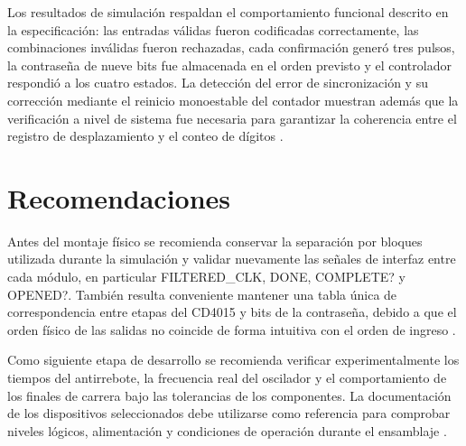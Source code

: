 \documentclass[10pt,journal]{IEEEtran}
\begin{document}
Los resultados de simulación respaldan el comportamiento funcional descrito en la especificación: las entradas válidas fueron codificadas correctamente, las combinaciones inválidas fueron rechazadas, cada confirmación generó tres pulsos, la contraseña de nueve bits fue almacenada en el orden previsto y el controlador respondió a los cuatro estados. La detección del error de sincronización y su corrección mediante el reinicio monoestable del contador muestran además que la verificación a nivel de sistema fue necesaria para garantizar la coherencia entre el registro de desplazamiento y el conteo de dígitos \cite{bitacora}.

\section{Recomendaciones}
Antes del montaje físico se recomienda conservar la separación por bloques utilizada durante la simulación y validar nuevamente las señales de interfaz entre cada módulo, en particular FILTERED\_CLK, DONE, COMPLETE? y OPENED?. También resulta conveniente mantener una tabla única de correspondencia entre etapas del CD4015 y bits de la contraseña, debido a que el orden físico de las salidas no coincide de forma intuitiva con el orden de ingreso \cite{bitacora}.

Como siguiente etapa de desarrollo se recomienda verificar experimentalmente los tiempos del antirrebote, la frecuencia real del oscilador y el comportamiento de los finales de carrera bajo las tolerancias de los componentes. La documentación de los dispositivos seleccionados debe utilizarse como referencia para comprobar niveles lógicos, alimentación y condiciones de operación durante el ensamblaje \cite{hc14,hc393,hc4052,hc238,cd4015}.
\end{document}
